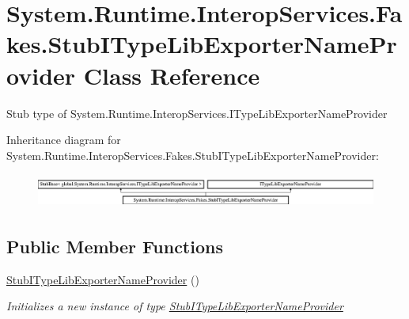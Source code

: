 \hypertarget{class_system_1_1_runtime_1_1_interop_services_1_1_fakes_1_1_stub_i_type_lib_exporter_name_provider}{\section{System.\-Runtime.\-Interop\-Services.\-Fakes.\-Stub\-I\-Type\-Lib\-Exporter\-Name\-Provider Class Reference}
\label{class_system_1_1_runtime_1_1_interop_services_1_1_fakes_1_1_stub_i_type_lib_exporter_name_provider}
}


Stub type of System.\-Runtime.\-Interop\-Services.\-I\-Type\-Lib\-Exporter\-Name\-Provider 


Inheritance diagram for System.\-Runtime.\-Interop\-Services.\-Fakes.\-Stub\-I\-Type\-Lib\-Exporter\-Name\-Provider\-:\begin{figure}[H]
\begin{center}
\leavevmode
\includegraphics[height=1.126761cm]{class_system_1_1_runtime_1_1_interop_services_1_1_fakes_1_1_stub_i_type_lib_exporter_name_provider}
\end{center}
\end{figure}
\subsection*{Public Member Functions}
\begin{DoxyCompactItemize}
\item 
\hyperlink{class_system_1_1_runtime_1_1_interop_services_1_1_fakes_1_1_stub_i_type_lib_exporter_name_provider_a34c7ff88db2a6ce4a0f42584ddb4ae59}{Stub\-I\-Type\-Lib\-Exporter\-Name\-Provider} ()
\begin{DoxyCompactList}\small\item\em Initializes a new instance of type \hyperlink{class_system_1_1_runtime_1_1_interop_services_1_1_fakes_1_1_stub_i_type_lib_exporter_name_provider}{Stub\-I\-Type\-Lib\-Exporter\-Name\-Provider}\end{DoxyCompactList}\end{DoxyCompactItemize}
